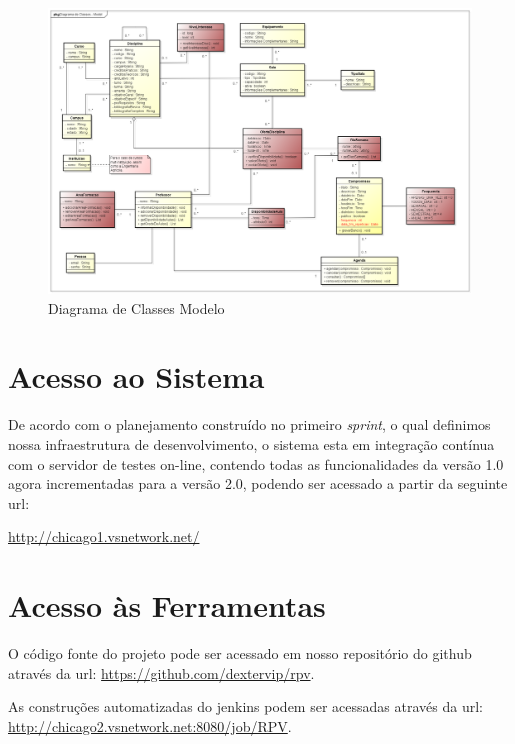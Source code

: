 \documentclass{abnt}
\begin{document}
		 \begin{landscape}
		 			\begin{figure}[htp]
		 				\begin{center}
		 					 \includegraphics[width=600px]{DiagramaClassesModelo}
		 					 \caption{Diagrama de Classes Modelo}
		 					 \label{fig:DiagramaClassesModelo}
		 				\end{center}
		 			\end{figure}
		 		\end{landscape}
		 		 
\clearpage
	\section{Acesso ao Sistema}
			De acordo com o planejamento construído no primeiro \emph{sprint}, o qual definimos nossa infraestrutura de desenvolvimento, 
			o sistema esta em integração contínua com o servidor de testes on-line, contendo todas as funcionalidades da versão 1.0 agora incrementadas para a versão 2.0, 
			podendo ser acessado a partir da seguinte url:
		
			\url{http://chicago1.vsnetwork.net/}
			
			
			

	\section{Acesso às Ferramentas}
		
		O código fonte do projeto pode ser acessado em nosso repositório do github\cite{GITHUB} através da url: \url{https://github.com/dextervip/rpv}. 
		
		As construções automatizadas do jenkins podem ser acessadas através da url: \url{http://chicago2.vsnetwork.net:8080/job/RPV}.

	\clearpage

	\nocite{*}
	
			
\end{document}
